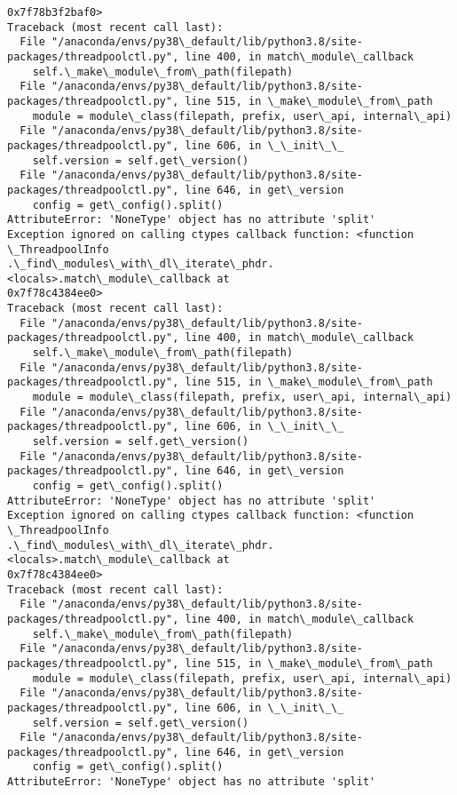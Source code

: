 \documentclass[11pt]{article}
\begin{document}
\begin{Verbatim}[commandchars=\\\{\}]
0x7f78b3f2baf0>
Traceback (most recent call last):
  File "/anaconda/envs/py38\_default/lib/python3.8/site-
packages/threadpoolctl.py", line 400, in match\_module\_callback
    self.\_make\_module\_from\_path(filepath)
  File "/anaconda/envs/py38\_default/lib/python3.8/site-
packages/threadpoolctl.py", line 515, in \_make\_module\_from\_path
    module = module\_class(filepath, prefix, user\_api, internal\_api)
  File "/anaconda/envs/py38\_default/lib/python3.8/site-
packages/threadpoolctl.py", line 606, in \_\_init\_\_
    self.version = self.get\_version()
  File "/anaconda/envs/py38\_default/lib/python3.8/site-
packages/threadpoolctl.py", line 646, in get\_version
    config = get\_config().split()
AttributeError: 'NoneType' object has no attribute 'split'
Exception ignored on calling ctypes callback function: <function \_ThreadpoolInfo
.\_find\_modules\_with\_dl\_iterate\_phdr.<locals>.match\_module\_callback at
0x7f78c4384ee0>
Traceback (most recent call last):
  File "/anaconda/envs/py38\_default/lib/python3.8/site-
packages/threadpoolctl.py", line 400, in match\_module\_callback
    self.\_make\_module\_from\_path(filepath)
  File "/anaconda/envs/py38\_default/lib/python3.8/site-
packages/threadpoolctl.py", line 515, in \_make\_module\_from\_path
    module = module\_class(filepath, prefix, user\_api, internal\_api)
  File "/anaconda/envs/py38\_default/lib/python3.8/site-
packages/threadpoolctl.py", line 606, in \_\_init\_\_
    self.version = self.get\_version()
  File "/anaconda/envs/py38\_default/lib/python3.8/site-
packages/threadpoolctl.py", line 646, in get\_version
    config = get\_config().split()
AttributeError: 'NoneType' object has no attribute 'split'
Exception ignored on calling ctypes callback function: <function \_ThreadpoolInfo
.\_find\_modules\_with\_dl\_iterate\_phdr.<locals>.match\_module\_callback at
0x7f78c4384ee0>
Traceback (most recent call last):
  File "/anaconda/envs/py38\_default/lib/python3.8/site-
packages/threadpoolctl.py", line 400, in match\_module\_callback
    self.\_make\_module\_from\_path(filepath)
  File "/anaconda/envs/py38\_default/lib/python3.8/site-
packages/threadpoolctl.py", line 515, in \_make\_module\_from\_path
    module = module\_class(filepath, prefix, user\_api, internal\_api)
  File "/anaconda/envs/py38\_default/lib/python3.8/site-
packages/threadpoolctl.py", line 606, in \_\_init\_\_
    self.version = self.get\_version()
  File "/anaconda/envs/py38\_default/lib/python3.8/site-
packages/threadpoolctl.py", line 646, in get\_version
    config = get\_config().split()
AttributeError: 'NoneType' object has no attribute 'split'

\end{Verbatim}
\end{document}

